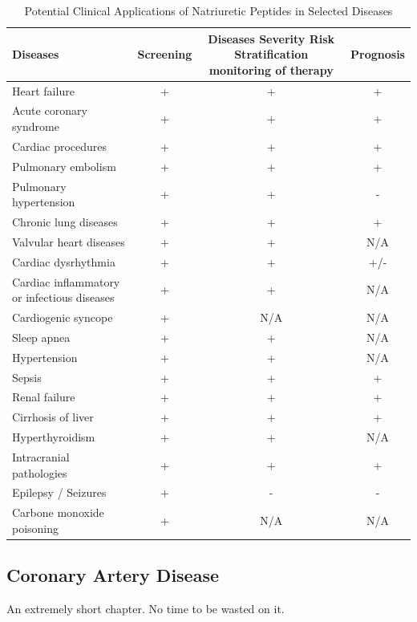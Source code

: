\documentclass[14pt,a4paper,onecolumn]{article}
\begin{document}
\begin{table}
    \begin{tabular}{|l|c|c|c|}

        Diseases & Screening & Diseases Severity \newline Risk Stratification \newline monitoring of therapy & Prognosis \\
        \hline
        Heart failure & + & + & + \\
        Acute coronary syndrome & + & + & + \\
        Cardiac procedures & + & + & + \\
        \hline
        Pulmonary embolism & + & + & + \\
        \hline
        Pulmonary hypertension & + & + & - \\
        \hline
        Chronic lung diseases & + & + & + \\
        \hline
        Valvular heart diseases & + & + & N/A \\
        \hline
        Cardiac dysrhythmia & + & + & +/- \\
        \hline
        Cardiac inflammatory or infectious diseases & + & + & N/A \\
        \hline
        Cardiogenic syncope & + & N/A & N/A \\
        \hline
        Sleep apnea & + & + & N/A \\
        \hline
        Hypertension & + & + & N/A \\
        \hline
        Sepsis & + & + & + \\
        \hline
        Renal failure & + & + & + \\
        \hline
        Cirrhosis of liver & + & + & + \\
        \hline
        Hyperthyroidism & + & + & N/A \\
        \hline
        Intracranial pathologies & + & + & + \\
        \hline
        Epilepsy / Seizures & + & - & - \\
        \hline
        Carbone monoxide poisoning & + & N/A & N/A \\
        \hline
    \end{tabular}
    \caption{Potential Clinical Applications of Natriuretic Peptides in Selected Diseases}
    \label{NP_applications}
\end{table}

\subsection{Coronary Artery Disease}
An extremely short chapter.  No time to be wasted on it.
\end{document}
